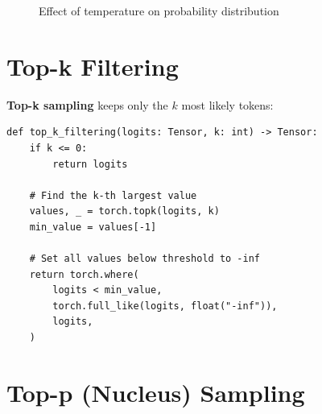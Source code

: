 \begin{figure}[H]
\centering
{}
\caption{Effect of temperature on probability distribution}
\label{fig:temperature}
\end{figure}

\section{Top-k Filtering}

\textbf{Top-k sampling} keeps only the $k$ most likely tokens:

\begin{lstlisting}[style=python, caption={Top-k filtering from generate.py}]
def top_k_filtering(logits: Tensor, k: int) -> Tensor:
    if k <= 0:
        return logits

    # Find the k-th largest value
    values, _ = torch.topk(logits, k)
    min_value = values[-1]

    # Set all values below threshold to -inf
    return torch.where(
        logits < min_value,
        torch.full_like(logits, float("-inf")),
        logits,
    )
\end{lstlisting}

\section{Top-p (Nucleus) Sampling}

